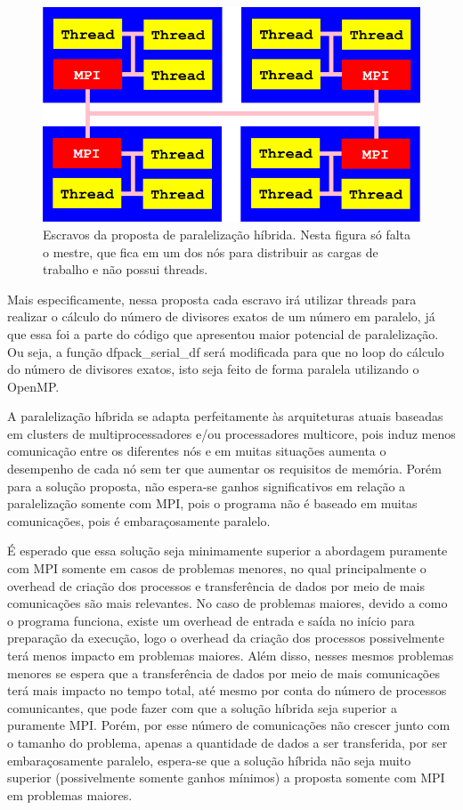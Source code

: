 \documentclass[12pt]{article}
\begin{document}
\begin{figure}[H]
	\centering
	\includegraphics[width=0.7\linewidth]{./hybridparallel}
	\caption{Escravos da proposta de paralelização híbrida. Nesta figura só falta o mestre, que fica em um dos nós para distribuir as cargas de trabalho e não possui threads.}
	\label{fig:hybridparallel}
\end{figure}

Mais especificamente, nessa proposta cada escravo irá utilizar threads para realizar o cálculo do número de divisores exatos de um número em paralelo, já que essa foi a parte do código que apresentou maior potencial de paralelização. Ou seja, a função dfpack\_serial\_df será modificada para que no loop do cálculo do número de divisores exatos, isto seja feito de forma paralela utilizando o OpenMP.

A paralelização híbrida se adapta perfeitamente às arquiteturas atuais baseadas em clusters de multiprocessadores e/ou processadores multicore, pois induz menos comunicação entre os diferentes nós e em muitas situações aumenta o desempenho de cada nó sem ter que aumentar os requisitos de memória. Porém para a solução proposta, não espera-se ganhos significativos em relação a paralelização somente com MPI, pois o programa não é baseado em muitas comunicações, pois é embaraçosamente paralelo.

É esperado que essa solução seja minimamente superior a abordagem puramente com MPI somente em casos de problemas menores, no qual principalmente o overhead de criação dos processos e transferência de dados por meio de mais comunicações são mais relevantes. No caso de problemas maiores, devido a como o programa funciona, existe um overhead de entrada e saída no início para preparação da execução, logo o overhead da criação dos processos possivelmente terá menos impacto em problemas maiores. Além disso, nesses mesmos problemas menores se espera que a transferência de dados por meio de mais comunicações terá mais impacto no tempo total, até mesmo por conta do número de processos comunicantes, que pode fazer com que a solução híbrida seja superior a puramente MPI. Porém, por esse número de comunicações não crescer junto com o tamanho do problema, apenas a quantidade de dados a ser transferida, por ser embaraçosamente paralelo, espera-se que a solução híbrida não seja muito superior (possivelmente somente ganhos mínimos) a proposta somente com MPI em problemas maiores.
\end{document}
